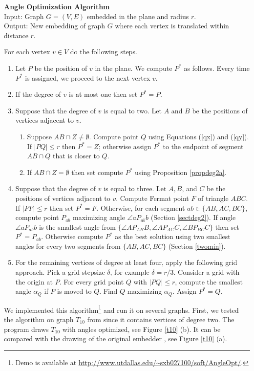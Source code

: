 \documentclass[10pt]{article}
\begin{document}
{\bf Angle Optimization Algorithm}\\
Input: Graph $G=(V,E)$ embedded in the plane and radius $r$.\\
Output: New embedding of graph $G$ where each vertex is translated within distance $r$.

For each vertex $v\in V$ do the following steps.
\begin{enumerate}
\item Let $P$ be the position of $v$ in the plane. We compute $P^*$ as follows. Every time  $P^*$ is assigned, we proceed to the next vertex $v$.
\item If the degree of $v$ is at most one then set $P^*=P$.
\item Suppose that the degree of $v$ is equal to two. Let $A$ and $B$ be the positions of vertices adjacent to $v$. 
\begin{enumerate}
\item
Suppose $AB\cap Z\ne\emptyset$. Compute point $Q$ using Equations (\ref{qx}) and (\ref{qy}).  
If $|PQ|\le r$ then $P^*=Z$; otherwise assign $P^*$ to the endpoint of segment $AB\cap Q$ that is closer to $Q$.
\item If $AB\cap Z=\emptyset$ then set compute $P^*$ using Proposition \ref{propdeg2a}. 
\end{enumerate}
\item Suppose that the degree of $v$ is equal to three. 
Let $A,B$, and $C$ be the positions of vertices adjacent to $v$.
Compute Fermat point $F$ of triangle $ABC$.
If $|PF|\le r$ then set $P^*=F$. Otherwise, 
for each segment $ab\in \{AB,AC,BC\}$, compute point $P_{ab}$ maximizing angle 
$\angle aP_{ab}b$ (Section \ref{sectdeg2}). If angle $\angle aP_{ab}b$ is the smallest angle from
$\{ \angle AP_{AB}B, \angle AP_{AC}C, \angle BP_{BC}C \}$ then set $P^*=P_{ab}$. 
Otherwise compute $P^*$ as the best solution using two smallest angles for every two segments from $\{ AB,AC,BC\}$ (Section \ref{twomin}). 
\item 
For the remaining vertices of degree at least four, apply the following grid approach.
Pick a grid stepsize $\delta$, for example $\delta=r/3$. 
Consider a grid with the origin at $P$. For every grid point $Q$ with $|PQ|\le r$,
compute the smallest angle $\alpha_Q$ if $P$ is moved to $Q$. Find $Q$ maximizing 
$\alpha_Q$. Assign $P^*=Q$.
\end{enumerate}


We implemented this algorithm\footnote{Demo is available at 
\url{http://www.utdallas.edu/~sxb027100/soft/AngleOpt/}.} and run it on several graphs.
First, we tested the algorithm on graph $T_{10}$ from \cite{rv-06} since it contains vertices of degree two.  The program draws $T_{10}$ with angles optimized, see Figure \ref{t10} (b). 
It can be compared with the drawing of the original embedder \cite{embedder}, see
Figure \ref{t10} (a). 
\end{document}
